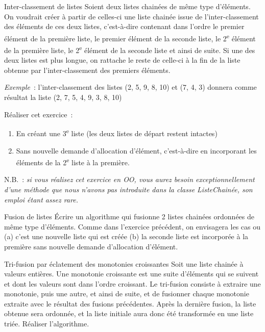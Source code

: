 	\begin{Exercice}{Inter-classement de listes}
		Soient deux listes chainées de même type d'éléments. On voudrait 
		créer à partir de celles-ci une liste chainée issue de
		l'inter-classement des éléments de ces deux listes, c'est-à-dire 
		contenant dans l'ordre le premier élément de la
		première liste, le premier élément de la seconde liste, 
		le 2\textsuperscript{e} élément de la première liste, le
		2\textsuperscript{e} élément de la seconde liste et ainsi de suite. 
		Si une des deux listes est plus longue, on
		rattache le reste de celle-ci à la fin de la liste obtenue par 
		l'inter-classement des premiers éléments.

		\textit{Exemple}~: l'inter-classement des listes (2, 5, 9, 8, 10) et 
		(7, 4, 3) donnera comme résultat la liste
		(2, 7, 5, 4, 9, 3, 8, 10)

		Réaliser cet exercice~:

		\begin{enumerate}
			\item {
				En créant une 3\textsuperscript{e} liste 
				(les deux listes de départ restent intactes)}
			\item {
				Sans nouvelle demande d'allocation d'élément, c'est-à-dire 
				en incorporant les éléments de la 2\textsuperscript{e}
				liste à la première.}
		\end{enumerate}
		
		N.B.~: \textit{si vous réalisez cet exercice en OO, vous aurez besoin 
		exceptionnellement d'une méthode } 
		\textit{ que nous n'avons pas introduite dans la classe ListeChainée, 
		son emploi étant assez rare.}
	\end{Exercice}
	
	\begin{Exercice}{Fusion de listes}
		Écrire un algorithme qui fusionne 2 listes chainées ordonnées 
		de même type d'éléments. Comme dans l'exercice précédent,
		on envisagera les cas ou (a) c'est une nouvelle liste qui 
		est créée (b) la seconde liste est incorporée à la première
		sans nouvelle demande d'allocation d'élément.
	\end{Exercice}
	
	\begin{Exercice}{Tri-fusion par éclatement des monotonies croissantes}
		Soit une liste chainée à valeurs entières. Une monotonie croissante 
		est une suite d'éléments qui se suivent et dont les
		valeurs sont dans l'ordre croissant. Le tri-fusion consiste à extraire 
		une monotonie, puis une autre, et ainsi de
		suite, et de fusionner chaque monotonie extraite avec le résultat 
		des fusions précédentes. Après la dernière fusion, la
		liste obtenue sera ordonnée, et la liste initiale aura donc été 
		transformée en une liste triée. Réaliser l'algorithme.
	\end{Exercice}

